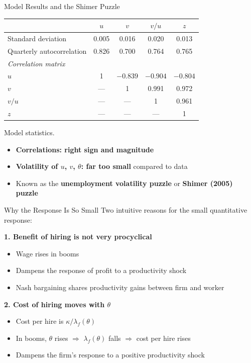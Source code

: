 \documentclass[blue]{beamer}
\begin{document}
\begin{frame}{Model Results and the Shimer Puzzle}
	\begin{table}
		\centering
		\small
		\begin{tabular}{lcccc}
			\toprule
			& $u$ & $v$ & $v/u$ & $z$ \\
			\midrule
			Standard deviation & 0.005 & 0.016 & 0.020 & 0.013 \\
			Quarterly autocorrelation & 0.826 & 0.700 & 0.764 & 0.765 \\
			\midrule
			\multicolumn{5}{l}{\textit{Correlation matrix}} \\
			$u$ & 1 & $-0.839$ & $-0.904$ & $-0.804$ \\
			$v$ & --- & 1 & 0.991 & 0.972 \\
			$v/u$ & --- & --- & 1 & 0.961 \\
			$z$ & --- & --- & --- & 1 \\
			\bottomrule
		\end{tabular}
		
		Model statistics.
	\end{table}
	
	\begin{itemize}
		\item \textbf{Correlations: right sign and magnitude}
		\item \textbf{Volatility of $u$, $v$, $\theta$: far too small} compared to data
		\item Known as the \textbf{unemployment volatility puzzle} or \textbf{Shimer (2005) puzzle}
	\end{itemize}
\end{frame}

\begin{frame}{Why the Response Is So Small}
	Two intuitive reasons for the small quantitative response:
	
	\bigskip
	\textbf{1. Benefit of hiring is not very procyclical}
	\begin{itemize}
		\item Wage rises in booms
		\item Dampens the response of profit to a productivity shock
		\item Nash bargaining shares productivity gains between firm and worker
	\end{itemize}
	
	\bigskip
	\textbf{2. Cost of hiring moves with $\theta$}
	\begin{itemize}
		\item Cost per hire is $\kappa / \lambda_f(\theta)$
		\item In booms, $\theta$ rises $\Rightarrow$ $\lambda_f(\theta)$ falls $\Rightarrow$ cost per hire rises
		\item Dampens the firm's response to a positive productivity shock
	\end{itemize}
\end{frame}
\end{document}
